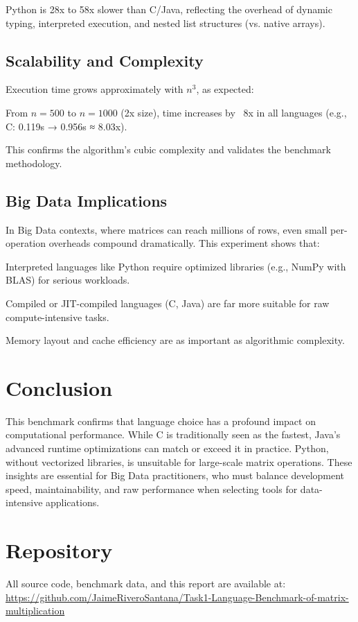 \documentclass[12pt]{article}
\begin{document}
Python is 28x to 58x slower than C/Java, reflecting the overhead of dynamic typing, interpreted execution, and nested list structures (vs. native arrays).

\subsection{Scalability and Complexity}
Execution time grows approximately with $n^3$, as expected:
\item From $n=500$ to $n=1000$ (2x size), time increases by ~8x in all languages (e.g., C: 0.119s → 0.956s ≈ 8.03x).
    \item This confirms the algorithm’s cubic complexity and validates the benchmark methodology.

\subsection{Big Data Implications}
In Big Data contexts, where matrices can reach millions of rows, even small per-operation overheads compound dramatically. This experiment shows that:
\item Interpreted languages like Python require optimized libraries (e.g., NumPy with BLAS) for serious workloads.
    \item Compiled or JIT-compiled languages (C, Java) are far more suitable for raw compute-intensive tasks.
    \item Memory layout and cache efficiency are as important as algorithmic complexity.

\section{Conclusion}
This benchmark confirms that language choice has a profound impact on computational performance. While C is traditionally seen as the fastest, Java’s advanced runtime optimizations can match or exceed it in practice. Python, without vectorized libraries, is unsuitable for large-scale matrix operations. These insights are essential for Big Data practitioners, who must balance development speed, maintainability, and raw performance when selecting tools for data-intensive applications.

\section*{Repository}
All source code, benchmark data, and this report are available at:  
\url{https://github.com/JaimeRiveroSantana/Task1-Language-Benchmark-of-matrix-multiplication}
\end{document}
